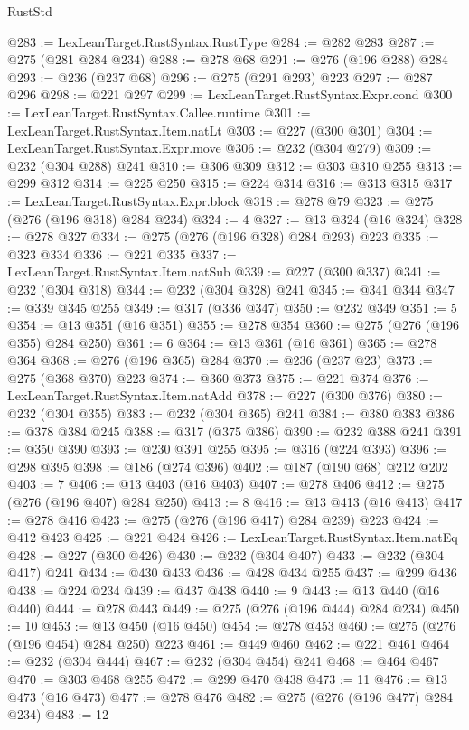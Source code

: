 \begin{lexlean}{RustStd}
\begin{coremodule}
@283 := LexLeanTarget.RustSyntax.RustType
@284 := @282 @283
@287 := @275 (@281 @284 @234)
@288 := @278 @68
@291 := @276 (@196 @288) @284
@293 := @236 (@237 @68)
@296 := @275 (@291 @293) @223
@297 := @287 @296
@298 := @221 @297
@299 := LexLeanTarget.RustSyntax.Expr.cond
@300 := LexLeanTarget.RustSyntax.Callee.runtime
@301 := LexLeanTarget.RustSyntax.Item.natLt
@303 := @227 (@300 @301)
@304 := LexLeanTarget.RustSyntax.Expr.move
@306 := @232 (@304 @279)
@309 := @232 (@304 @288) @241
@310 := @306 @309
@312 := @303 @310 @255
@313 := @299 @312
@314 := @225 @250
@315 := @224 @314
@316 := @313 @315
@317 := LexLeanTarget.RustSyntax.Expr.block
@318 := @278 @79
@323 := @275 (@276 (@196 @318) @284 @234)
@324 := 4
@327 := @13 @324 (@16 @324)
@328 := @278 @327
@334 := @275 (@276 (@196 @328) @284 @293) @223
@335 := @323 @334
@336 := @221 @335
@337 := LexLeanTarget.RustSyntax.Item.natSub
@339 := @227 (@300 @337)
@341 := @232 (@304 @318)
@344 := @232 (@304 @328) @241
@345 := @341 @344
@347 := @339 @345 @255
@349 := @317 (@336 @347)
@350 := @232 @349
@351 := 5
@354 := @13 @351 (@16 @351)
@355 := @278 @354
@360 := @275 (@276 (@196 @355) @284 @250)
@361 := 6
@364 := @13 @361 (@16 @361)
@365 := @278 @364
@368 := @276 (@196 @365) @284
@370 := @236 (@237 @23)
@373 := @275 (@368 @370) @223
@374 := @360 @373
@375 := @221 @374
@376 := LexLeanTarget.RustSyntax.Item.natAdd
@378 := @227 (@300 @376)
@380 := @232 (@304 @355)
@383 := @232 (@304 @365) @241
@384 := @380 @383
@386 := @378 @384 @245
@388 := @317 (@375 @386)
@390 := @232 @388 @241
@391 := @350 @390
@393 := @230 @391 @255
@395 := @316 (@224 @393)
@396 := @298 @395
@398 := @186 (@274 @396)
@402 := @187 (@190 @68) @212 @202
@403 := 7
@406 := @13 @403 (@16 @403)
@407 := @278 @406
@412 := @275 (@276 (@196 @407) @284 @250)
@413 := 8
@416 := @13 @413 (@16 @413)
@417 := @278 @416
@423 := @275 (@276 (@196 @417) @284 @239) @223
@424 := @412 @423
@425 := @221 @424
@426 := LexLeanTarget.RustSyntax.Item.natEq
@428 := @227 (@300 @426)
@430 := @232 (@304 @407)
@433 := @232 (@304 @417) @241
@434 := @430 @433
@436 := @428 @434 @255
@437 := @299 @436
@438 := @224 @234
@439 := @437 @438
@440 := 9
@443 := @13 @440 (@16 @440)
@444 := @278 @443
@449 := @275 (@276 (@196 @444) @284 @234)
@450 := 10
@453 := @13 @450 (@16 @450)
@454 := @278 @453
@460 := @275 (@276 (@196 @454) @284 @250) @223
@461 := @449 @460
@462 := @221 @461
@464 := @232 (@304 @444)
@467 := @232 (@304 @454) @241
@468 := @464 @467
@470 := @303 @468 @255
@472 := @299 @470 @438
@473 := 11
@476 := @13 @473 (@16 @473)
@477 := @278 @476
@482 := @275 (@276 (@196 @477) @284 @234)
@483 := 12

\end{coremodule}
\end{lexlean}
